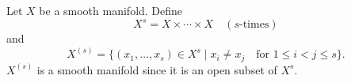 Let $X$ be a smooth manifold. Define
$$X^s = X \times \cdots \times X \quad (s\text{-times})$$
and
$$X^{(s)} = \{(x_1, \ldots, x_s) \in X^s \mid x_i \neq x_j \quad \text{for } 1 \leq i < j \leq s\}.$$
$X^{(s)}$ is a smooth manifold since it is an open subset of $X^s$.

